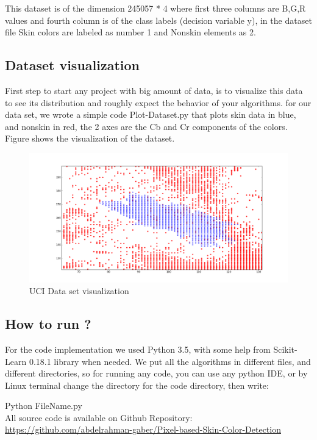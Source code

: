 \documentclass[12pt]{article} %
\begin{document}
This dataset is of the dimension 245057 * 4 where first three columns are B,G,R values and fourth column is of the class labels (decision variable y), in the dataset file Skin colors are labeled as number 1 and Nonskin elements as 2.

\subsection{Dataset visualization}
First step to start any project with big amount of data, is to visualize this data to see its distribution and roughly expect the behavior of your algorithms. for our data set, we wrote a simple code Plot-Dataset.py that plots skin data in blue, and nonskin in red, the 2 axes are the Cb and Cr components of the colors. Figure shows the visualization of the dataset. 

\begin{figure}[H]
		\centering
		\includegraphics[width=\textwidth]{Skin-Nonskin-zoomed.png}
		\caption{UCI Data set visualization}	
\end{figure}

\subsection{How to run ?}
For the code implementation we used Python 3.5, with some help from Scikit-Learn 0.18.1 library when needed. We put all the algorithms in different files, and different directories, so for running any code, you can use any python IDE, or by Linux terminal change the directory for the code directory, then write:

\hspace*{\fill}
        Python  FileName.py
\hspace*{\fill} \\


All source code is available on Github Repository:
\href{https://github.com/abdelrahman-gaber/Pixel-based-Skin-Color-Detection}{https://github.com/abdelrahman-gaber/Pixel-based-Skin-Color-Detection } 
\end{document}
